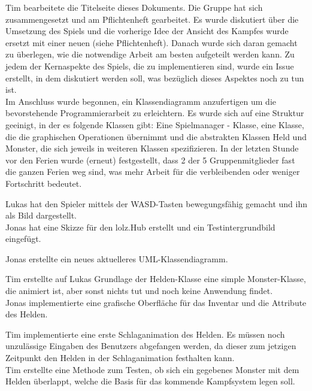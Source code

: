 
Tim bearbeitete die Titelseite dieses Dokuments. Die Gruppe hat sich zusammengesetzt und am Pflichtenheft gearbeitet. Es wurde diskutiert über die Umsetzung des Spiels und die vorherige Idee der Ansicht des Kampfes wurde ersetzt mit einer neuen (siehe Pflichtenheft). Danach wurde sich daran gemacht zu überlegen, wie die notwendige Arbeit am besten aufgeteilt werden kann. Zu jedem der Kernaspekte des Spiels, die zu implementieren sind, wurde ein \glqq{}Issue\grqq{} erstellt, in dem diskutiert werden soll, was bezüglich dieses Aspektes noch zu tun ist.\\
Im Anschluss wurde begonnen, ein Klassendiagramm anzufertigen um die bevorstehende Programmierarbeit zu erleichtern. Es wurde sich auf eine Struktur geeinigt, in der es folgende Klassen gibt: Eine \glqq{}Spielmanager\grqq{} - Klasse, eine Klasse, die die graphischen Operationen übernimmt und die abstrakten Klassen Held und Monster, die sich jeweils in weiteren Klassen spezifizieren. In der letzten Stunde vor den Ferien wurde (erneut) festgestellt, dass 2 der 5 Gruppenmitglieder fast die ganzen Ferien weg sind, was mehr Arbeit für die verbleibenden oder weniger Fortschritt bedeutet. \\


Lukas hat den Spieler mittels der WASD-Tasten bewegungsfähig gemacht und ihn als Bild dargestellt. \\
Jonas hat eine Skizze für den lolz.Hub erstellt und ein Testintergrundbild eingefügt. \\


Jonas erstellte ein neues aktuelleres UML-Klassendiagramm.\\


Tim erstellte auf Lukas Grundlage der Helden-Klasse eine simple Monster-Klasse, die animiert ist, aber sonst nichts tut und noch keine Anwendung findet. \\
Jonas implementierte eine grafische Oberfläche für das Inventar und die Attribute des Helden. \\


Tim implementierte eine erste Schlaganimation des Helden. Es müssen noch \glqq{}unzulässige Eingaben\grqq{} des Benutzers abgefangen werden, da dieser zum jetzigen Zeitpunkt den Helden in der Schlaganimation festhalten kann. \\
Tim erstellte eine Methode zum Testen, ob sich ein gegebenes Monster mit dem Helden überlappt, welche die Basis für das kommende Kampfsystem legen soll.\\

